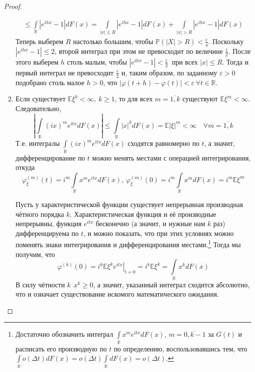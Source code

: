 \begin{proof}
\begin{enumerate}
\begin{multline*}
            \leqslant \int\limits_{\mathbb{R}} \left|e^{i h x}-1\right| d F(x)=\int\limits_{|x| \leqslant R}\left|e^{i h x}-1\right| d F(x)+\int\limits_{|x|>R}\left|e^{i h x}-1\right| d F(x)
        \end{multline*}
        Теперь выберем $R$ настолько большим, чтобы $\mathbb{P}(|X|>R) < \frac{\varepsilon}{4}$. Поскольку $\left|e^{i h x}-1\right| \leqslant 2$, второй интеграл при этом не превосходит по величине $\frac{\varepsilon}{2}$. После этого выберем $h$ столь малым, чтобы $\left|e^{i h x}-1\right|<\frac{\varepsilon}{2}~$ при всех $|x| \leqslant R$. Тогда и первый интеграл не превосходит $\frac{\varepsilon}{2}$ и, таким образом, по заданному $\varepsilon > 0$ подобрано столь малое $h >0$, что $|\varphi(t+h)-\varphi(t)|<\varepsilon~ \forall t \in \mathbb{R}$.
        \item Если существует $\mathbb{E}\xi^{k}<\infty,~ k \geqslant 1$, то для всех $m = \overline{1, k}$ существуют $\mathbb{E}\xi^{m}<\infty$. Следовательно,
        \begin{equation*}
            \left|\int\limits_{\mathbb{R}}(i x)^{m} e^{i t x} d F(x)\right| \leqslant \int\limits_{\mathbb{R}}|x|^{k} d F(x)=\mathbb{E}|\xi|^{m}<\infty \quad \forall m = \overline{1, k}
        \end{equation*}
        Т.е. интегралы $\int\limits_{\mathbb{R}}(i x)^{m} e^{i t x} d F(x)$ сходятся равномерно по $t$, а значит, дифференцирование по $t$ можно менять местами с операцией интегрирования, откуда
        \begin{equation*}
            \varphi_{\xi}^{(m)}(t)=i^{m} \int\limits_{\mathbb{R}} x^{m} e^{i t x} d F(x),~ \varphi_{\xi}^{(m)}(0)=i^{m} \int\limits_{\mathbb{R}} x^{m} d F(x)=i^{m} \mathbb{E}\xi^{m}
        \end{equation*}
        
        Пусть у характеристической функции существует непрерывная производная чётного порядка $k$. Характеристическая функция и её производные непрерывны, функция $e^{itx}$ бесконечно (а значит, и нужные нам $k$ раз) дифференцируема по $t$, и можно показать, что при этих условиях можно поменять знаки интегрирования и дифференцирования местами.\footnote{Достаточно обозначить интеграл $\int\limits_{\mathbb{R}}{x^{m} e^{itx}dF(x)}, \, m = \overline{0, k-1}$ за $G(t)$ и расписать его производную по $t$ по определению, воспользовавшись тем, что $\int\limits_{\mathbb{R}} o(\Delta t) dF(x) = o(\Delta t) \int\limits_{\mathbb{R}} dF(x) = o(\Delta t)$.}
        Тогда мы получим, что 
        $$\varphi^{(k)}(0) = i^k \left.\mathbb{E}\xi^k e^{itx}\right|_{t=0} = i^k \mathbb{E}\xi^k = 
        \int\limits_{\mathbb{R}} x^k dF(x)
        $$
        В силу чётности $k ~~ x^k \geqslant 0$, а значит, указанный интеграл сходится абсолютно, что и означает существование искомого математического ожидания.
    \end{enumerate}
\end{proof}

